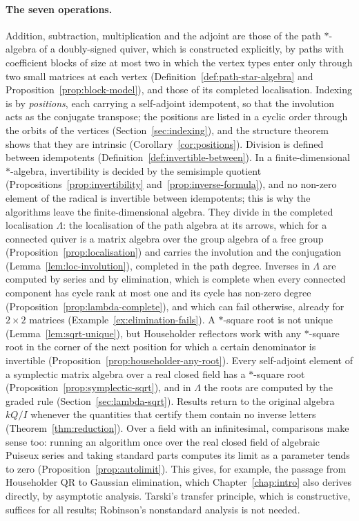\documentclass[12pt, a4paper]{report}
\theoremstyle{plain}
\theoremstyle{definition}
\theoremstyle{remark}
\theoremstyle{plain}
\begin{document}
\paragraph{The seven operations.} Addition, subtraction, multiplication and the adjoint are those of the path $*$-algebra of a doubly-signed quiver, which is constructed explicitly, by paths with coefficient blocks of size at most two in which the vertex types enter only through two small matrices at each vertex (Definition~\ref{def:path-star-algebra} and Proposition~\ref{prop:block-model}), and those of its completed localisation. Indexing is by \emph{positions}, each carrying a self-adjoint idempotent, so that the involution acts as the conjugate transpose; the positions are listed in a cyclic order through the orbits of the vertices (Section~\ref{sec:indexing}), and the structure theorem shows that they are intrinsic (Corollary~\ref{cor:positions}). Division is defined between idempotents (Definition~\ref{def:invertible-between}). In a finite-dimensional $*$-algebra, invertibility is decided by the semisimple quotient (Propositions~\ref{prop:invertibility} and~\ref{prop:inverse-formula}), and no non-zero element of the radical is invertible between idempotents; this is why the algorithms leave the finite-dimensional algebra. They divide in the completed localisation $\Lambda$: the localisation of the path algebra at its arrows, which for a connected quiver is a matrix algebra over the group algebra of a free group (Proposition~\ref{prop:localisation}) and carries the involution and the conjugation (Lemma~\ref{lem:loc-involution}), completed in the path degree. Inverses in $\Lambda$ are computed by series and by elimination, which is complete when every connected component has cycle rank at most one and its cycle has non-zero degree (Proposition~\ref{prop:lambda-complete}), and which can fail otherwise, already for $2\times2$ matrices (Example~\ref{ex:elimination-fails}). A $*$-square root is not unique (Lemma~\ref{lem:sqrt-unique}), but Householder reflectors work with any $*$-square root in the corner of the next position for which a certain denominator is invertible (Proposition~\ref{prop:householder-any-root}). Every self-adjoint element of a symplectic matrix algebra over a real closed field has a $*$-square root (Proposition~\ref{prop:symplectic-sqrt}), and in $\Lambda$ the roots are computed by the graded rule (Section~\ref{sec:lambda-sqrt}). Results return to the original algebra $kQ/I$ whenever the quantities that certify them contain no inverse letters (Theorem~\ref{thm:reduction}). Over a field with an infinitesimal, comparisons make sense too: running an algorithm once over the real closed field of algebraic Puiseux series and taking standard parts computes its limit as a parameter tends to zero (Proposition~\ref{prop:autolimit}). This gives, for example, the passage from Householder QR to Gaussian elimination, which Chapter~\ref{chap:intro} also derives directly, by asymptotic analysis. Tarski's transfer principle, which is constructive, suffices for all results; Robinson's nonstandard analysis is not needed.
\end{document}
